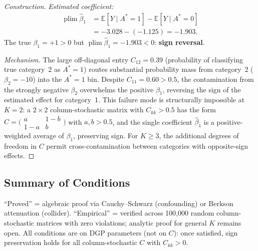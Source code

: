 \begin{proof}[Construction]
\emph{Estimated coefficient:}
\begin{align*}
  \operatorname{plim}\hat\beta_1
  &= \mathbb{E}[Y\mid A^*{=}1]-\mathbb{E}[Y\mid A^*{=}0]\\
  &= -3.028-(-1.125) = \mathbf{-1.903}.
\end{align*}
The true $\beta_1=+1>0$ but $\operatorname{plim}\hat\beta_1=-1.903<0$: \textbf{sign reversal}.

\emph{Mechanism.}
The large off-diagonal entry $C_{12}=0.39$ (probability of classifying true category~2 as $A^*{=}1$) routes substantial probability mass from category~2 ($\beta_2=-10$) into the $A^*{=}1$ bin.
Despite $C_{11}=0.60>0.5$, the contamination from the strongly negative $\beta_2$ overwhelms the positive $\beta_1$, reversing the sign of the estimated effect for category~1.
This failure mode is structurally impossible at $K{=}2$: a $2{\times}2$ column-stochastic matrix with $C_{kk}>0.5$ has the form $C=\bigl(\begin{smallmatrix}a&1{-}b\\1{-}a&b\end{smallmatrix}\bigr)$ with $a,b>0.5$, and the single coefficient $\hat\beta_1$ is a positive-weighted average of $\beta_1$, preserving sign.
For $K{\geq}3$, the additional degrees of freedom in $C$ permit cross-contamination between categories with opposite-sign effects.
\end{proof}

\subsection{Summary of Conditions}
\label{app:conditions}

``Proved'' = algebraic proof via Cauchy--Schwarz (confounding) or Berkson attenuation (collider).
``Empirical'' = verified across 100{,}000 random column-stochastic matrices with zero violations; analytic proof for general $K$ remains open.
All conditions are on DGP parameters (not on $C$): once satisfied, sign preservation holds for all column-stochastic $C$ with $C_{kk}>0$.

